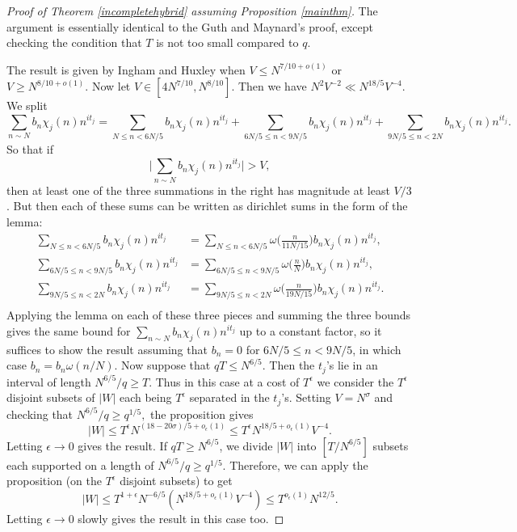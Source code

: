 \begin{proof}[Proof of Theorem \ref{incompletehybrid} assuming Proposition \ref{mainthm}]
The argument is essentially identical to the Guth and Maynard's proof, except checking the condition that $T$ is not too small compared to $q$.

The result is given by Ingham and Huxley when $V\leq N^{7/10+o(1)}$ or $V\geq N^{8/10+o(1)}$. Now let $V\in [4N^{7/10},N^{8/10}]$. Then we have $N^2V^{-2}\ll N^{18/5}V^{-4}$.
We split \[
\sum_{n\sim N} b_n\chi_j(n)n^{it_j}=\sum_{N\leq n< 6N/5} b_n\chi_j(n)n^{it_j} +\sum_{6N/5 \leq n < 9N/5} b_n\chi_j(n)n^{it_j} +\sum_{9N/5 \leq n < 2N} b_n\chi_j(n)n^{it_j}.
\]
So that if \[
\Big|\sum_{n\sim N} b_n\chi_j(n)n^{it_j}\Big|>V,
\]
then at least one of the three summations in the right has magnitude at least $V/3$.
But then each of these sums can be written as dirichlet sums in the form of the lemma: \begin{align*}
	\sum_{N\leq n< 6N/5} b_n\chi_j(n)n^{it_j} &=  \sum_{N\leq n< 6N/5} \omega\Bigg(\frac{n}{11N/15}\Bigg) b_n\chi_j(n)n^{it_j}, \\
	\sum_{6N/5 \leq n < 9N/5} b_n\chi_j(n)n^{it_j} &=  \sum_{6N/5 \leq n < 9N/5} \omega\Bigg(\frac{n}{N}\Bigg) b_n\chi_j(n)n^{it_j}, \\
	\sum_{9N/5 \leq n < 2N}  b_n\chi_j(n)n^{it_j} &=  \sum_{9N/5 \leq n < 2N}  \omega\Bigg(\frac{n}{19N/15}\Bigg) b_n\chi_j(n)n^{it_j}. \\
\end{align*}
Applying the lemma on each of these three pieces and summing the three bounds gives the same bound for $\sum_{n\sim N} b_n\chi_j(n)n^{it_j}$ up to a constant factor, so it suffices to show the result assuming that
$b_n=0$ for $6N/5 \leq n < 9N/5$, in which case $b_n=b_n\omega(n/N)$.
Now suppose that $qT\leq N^{6/5}$. Then the $t_j$'s lie in an interval of length $N^{6/5}/q\geq T$. Thus in this case at a cost of $T^{\epsilon}$ we consider the $T^{\epsilon}$ disjoint subsets of $|W|$ each
being $T^{\epsilon}$ separated in the $t_j$'s. Setting $V=N^{\sigma}$ and checking that $N^{6/5}/q\geq q^{1/5},$ the proposition gives\[
|W|\leq T^{\epsilon} N^{(18-20\sigma)/5+o_{\epsilon}(1)} \leq T^{\epsilon} N^{18/5+o_{\epsilon}(1)}V^{-4}.
\] 
Letting $\epsilon\to 0$ gives the result. If $qT\geq N^{6/5}$, we divide $|W|$ into $[T/N^{6/5}]$ subsets each supported on a length of $N^{6/5}/q\geq q^{1/5}$. Therefore, we can apply the proposition (on the $T^\epsilon$ disjoint subsets) to get \[
|W|\leq T^{1+\epsilon}  N^{-6/5}(N^{18/5+o_{\epsilon}(1)}V^{-4})\leq T^{o_\epsilon(1)}N^{12/5}.
\] 
Letting $\epsilon\to 0$ slowly gives the result in this case too.
\end{proof}
	

